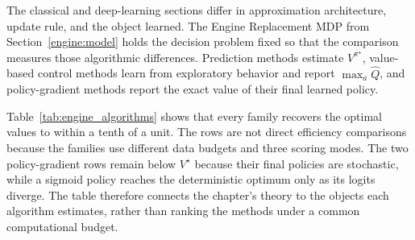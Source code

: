 The classical and deep-learning sections differ in approximation architecture, update rule, and the object learned. The Engine Replacement MDP from Section~\ref{engine:model} holds the decision problem fixed so that the comparison measures those algorithmic differences. Prediction methods estimate $V^{\pi^\star}$, value-based control methods learn from exploratory behavior and report $\max_a \hat Q$, and policy-gradient methods report the exact value of their final learned policy.



Table~\ref{tab:engine_algorithms} shows that every family recovers the optimal values to within a tenth of a unit. The rows are not direct efficiency comparisons because the families use different data budgets and three scoring modes. The two policy-gradient rows remain below $V^\star$ because their final policies are stochastic, while a sigmoid policy reaches the deterministic optimum only as its logits diverge. The table therefore connects the chapter's theory to the objects each algorithm estimates, rather than ranking the methods under a common computational budget.

\FloatBarrier
